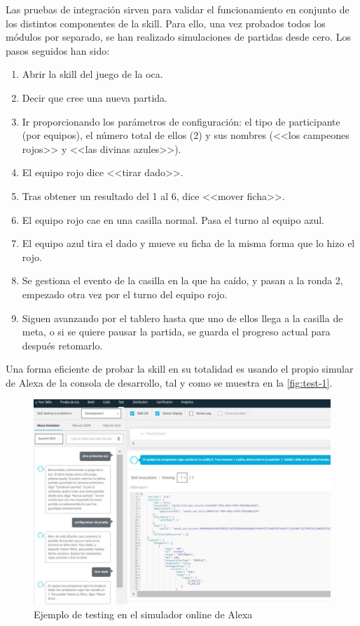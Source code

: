 Las pruebas de integración sirven para validar el funcionamiento en conjunto de los distintos componentes de la skill. Para ello, una vez probados todos los módulos por separado, se han realizado simulaciones de partidas desde cero. Los pasos seguidos han sido:
\begin{enumerate}
	\item Abrir la skill del juego de la oca.
	\item Decir que cree una nueva partida.
	\item Ir proporcionando los parámetros de configuración: el tipo de participante (por equipos), el número total de ellos (2) y sus nombres (<<los campeones rojos>> y <<las divinas azules>>).
	\item El equipo rojo dice <<tirar dado>>.
	\item Tras obtener un resultado del 1 al 6, dice <<mover ficha>>.
	\item El equipo rojo cae en una casilla normal. Pasa el turno al equipo azul.
	\item El equipo azul tira el dado y mueve su ficha de la misma forma que lo hizo el rojo.
	\item Se gestiona el evento de la casilla en la que ha caído, y pasan a la ronda 2, empezado otra vez por el turno del equipo rojo.
	\item Siguen avanzando por el tablero hasta que uno de ellos llega a la casilla de meta, o si se quiere pausar la partida, se guarda el progreso actual para después retomarlo.
\end{enumerate}

Una forma eficiente de probar la skill en su totalidad es usando el propio simular de Alexa de la consola de desarrollo, tal y como se muestra en la \autoref{fig:test-1}.

\begin{figure}[H]
	\centering
	\includegraphics[width=1\textwidth]{imgs/test-1.jpg}
	\caption{Ejemplo de testing en el simulador online de Alexa}
	\label{fig:test-1}
\end{figure}

